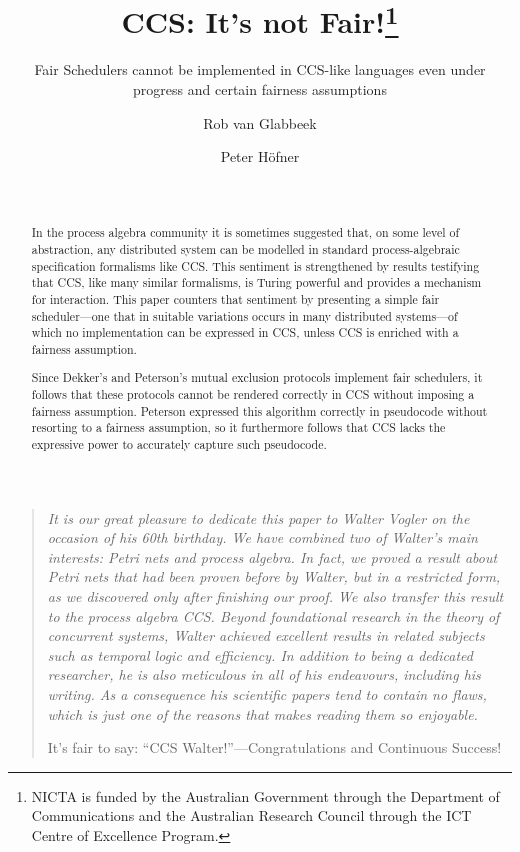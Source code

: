 \documentclass[smallcondensed]{svjour3}
\newcounter {part}
\begin{document}
\title{CCS: It's not Fair!\thanks{NICTA is funded by the Australian Government through the
    Department of Communications and the Australian Research Council
    through the ICT Centre of Excellence Program.
}
}
\subtitle{Fair Schedulers cannot be implemented in CCS-like languages even under progress and certain fairness assumptions}

\author{
    Rob van Glabbeek \and 
    Peter H\"ofner
}


\date{~}



\maketitle

\begin{quote}\it
It is our great pleasure to dedicate this paper to Walter Vogler on the occasion of his 60th birthday.
We have combined two of Walter's main interests: Petri nets and process algebra. 
In fact, we proved a result about Petri nets that had been proven before by Walter, but in a restricted form, 
as we discovered only after finishing our proof. 
We also transfer this result to the process algebra CCS.
Beyond foundational research in the theory of concurrent systems, Walter achieved excellent results in related subjects such 
as temporal logic and efficiency.
In addition to being a dedicated researcher, he is also 
meticulous in all of his endeavours, including his writing.
As a consequence his scientific papers tend to contain no flaws,
which is just one of the reasons that makes reading them so enjoyable.

It's fair to say: ``CCS Walter!''---Congratulations and Continuous Success!

\end{quote}

\begin{abstract}
In the process algebra community it is sometimes suggested that,
on some level of abstraction, any distributed system can be
modelled in standard process-algebraic specification formalisms like CCS\@.
This sentiment is strengthened by results testifying that CCS,
like many similar formalisms, is Turing powerful and provides a mechanism for 
interaction.
This paper counters that sentiment by presenting a simple fair
scheduler---one that in suitable variations occurs in many
distributed systems---of which no implementation can be
expressed in CCS, unless CCS is enriched with a fairness assumption.

Since  Dekker's and Peterson's mutual exclusion protocols implement fair schedulers,
it follows that these protocols cannot be rendered correctly in CCS
without imposing a fairness assumption. Peterson expressed this algorithm correctly in pseudocode
without resorting to a fairness assumption, so it furthermore follows that  CCS lacks the expressive
power to accurately capture such pseudocode.
\end{abstract}
\end{document}
